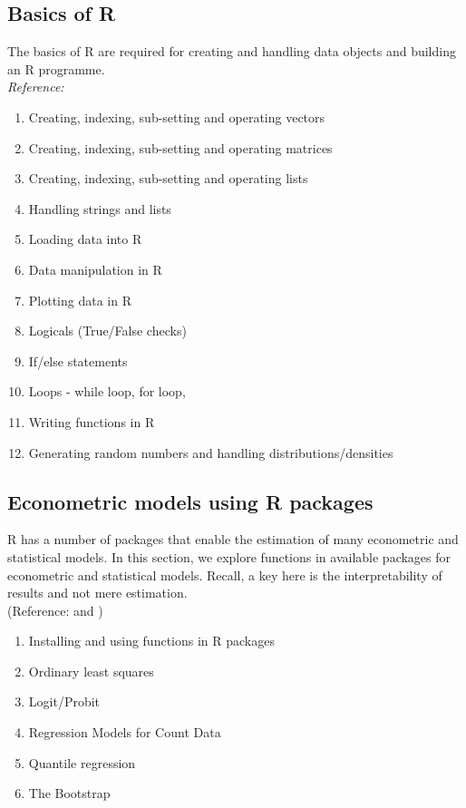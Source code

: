 \documentclass[12pt,a4paper]{article}
\begin{document}
	\subsection{Basics of R}
	The basics of R are required for creating and handling data objects and building an R programme.\\
	\textit{Reference: \cite[Chapters 2,3 \& 4]{bloomfield2014using}}
	\begin{enumerate}[label=(\alph*)]
		\item Creating, indexing, sub-setting and operating vectors
		\item Creating, indexing, sub-setting and operating matrices
		\item Creating, indexing, sub-setting and operating lists
		\item Handling strings and lists
		\item Loading data into R
		\item Data manipulation in R
		\item Plotting data in R
		\item Logicals (True/False checks)
		\item If/else statements 
		\item Loops - while loop, for loop, 
		\item Writing functions in R
		\item Generating random numbers and handling distributions/densities
	\end{enumerate}
	
	\subsection{Econometric models using R packages}
	R has a number of packages that enable the estimation of many econometric and statistical models. In this section, we explore functions in available packages for econometric and statistical models. Recall, a key here is the interpretability of results and not mere estimation. 
	\\ (Reference: \cite[Chapters 3, 5, \& 7]{kleiber2008applied} and \cite[Chapter 12]{wooldridge2010econometric})
	
	\begin{enumerate}[label=(\alph*)]
		\item Installing and using functions in R packages
		\item Ordinary least squares
		\item Logit/Probit
		\item Regression Models for Count Data 
		\item Quantile regression
		\item The Bootstrap
	\end{enumerate}
	
\end{document}
